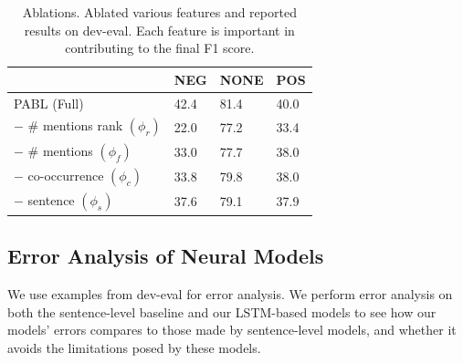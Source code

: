 \documentclass[11pt,a4paper]{article}
\begin{document}
\begin{table}[!t]
\centering
\begin{tabular}{| l | l | l | l |}
\hline
	& NEG	& NONE	& POS \\ \hline
PABL (Full)	& 42.4	& 81.4	& 40.0 \\
$-$ \# mentions rank $(\phi_r)$	& 22.0	& 77.2	& 33.4 \\
$-$ \# mentions $(\phi_f)$	& 33.0	& 77.7	& 38.0 \\
$-$ co-occurrence $(\phi_c)$	& 33.8	& 79.8	& 38.0 \\
$-$ sentence $(\phi_s)$	& 37.6	& 79.1	& 37.9 \\
\hline
\end{tabular}
\caption{\label{tab:ablations} Ablations. Ablated various features and reported results on dev-eval. Each feature is important in contributing to the final F1 score.}
\end{table}


\subsection{Error Analysis of Neural Models}
We use examples from dev-eval for error analysis.
We perform error analysis on both the sentence-level baseline and our LSTM-based models to see how our models' errors compares to those made by sentence-level models, and whether it avoids the limitations posed by these models.
\end{document}
